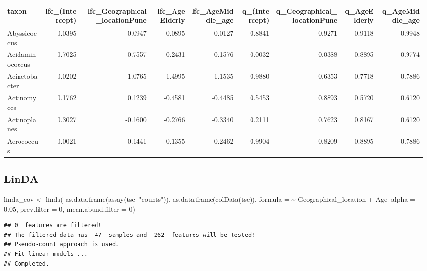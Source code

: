 \documentclass[
]{book}
\newenvironment{Shaded}{\begin{snugshade}}{\end{snugshade}}
\newcommand{\AttributeTok}[1]{\textcolor[rgb]{0.77,0.63,0.00}{#1}}
\newcommand{\DecValTok}[1]{\textcolor[rgb]{0.00,0.00,0.81}{#1}}
\newcommand{\FloatTok}[1]{\textcolor[rgb]{0.00,0.00,0.81}{#1}}
\newcommand{\FunctionTok}[1]{\textcolor[rgb]{0.00,0.00,0.00}{#1}}
\newcommand{\NormalTok}[1]{#1}
\newcommand{\OtherTok}[1]{\textcolor[rgb]{0.56,0.35,0.01}{#1}}
\newcommand{\StringTok}[1]{\textcolor[rgb]{0.31,0.60,0.02}{#1}}
\begin{document}
\begin{tabular}{l|r|r|r|r|r|r|r|r}
\hline
taxon & lfc\_(Intercept) & lfc\_Geographical\_locationPune & lfc\_AgeElderly & lfc\_AgeMiddle\_age & q\_(Intercept) & q\_Geographical\_locationPune & q\_AgeElderly & q\_AgeMiddle\_age\\
\hline
Abyssicoccus & 0.0395 & -0.0947 & 0.0895 & 0.0127 & 0.8841 & 0.9271 & 0.9118 & 0.9948\\
\hline
Acidaminococcus & 0.7025 & -0.7557 & -0.2431 & -0.1576 & 0.0032 & 0.0388 & 0.8895 & 0.9774\\
\hline
Acinetobacter & 0.0202 & -1.0765 & 1.4995 & 1.1535 & 0.9880 & 0.6353 & 0.7718 & 0.7886\\
\hline
Actinomyces & 0.1762 & 0.1239 & -0.4581 & -0.4485 & 0.5453 & 0.8893 & 0.5720 & 0.6120\\
\hline
Actinoplanes & 0.3027 & -0.1600 & -0.2766 & -0.3340 & 0.2111 & 0.7623 & 0.8167 & 0.6120\\
\hline
Aerococcus & 0.0021 & -0.1441 & 0.1355 & 0.2462 & 0.9904 & 0.8209 & 0.8895 & 0.7886\\
\hline
\end{tabular}

\hypertarget{linda-1}{%
\subsection{LinDA}\label{linda-1}}

\begin{Shaded}
\begin{Highlighting}[]
\NormalTok{linda\_cov }\OtherTok{\textless{}{-}} \FunctionTok{linda}\NormalTok{(}
  \FunctionTok{as.data.frame}\NormalTok{(}\FunctionTok{assay}\NormalTok{(tse, }\StringTok{"counts"}\NormalTok{)), }
  \FunctionTok{as.data.frame}\NormalTok{(}\FunctionTok{colData}\NormalTok{(tse)), }
  \AttributeTok{formula =} \StringTok{\textquotesingle{}\textasciitilde{} Geographical\_location + Age\textquotesingle{}}\NormalTok{, }
  \AttributeTok{alpha =} \FloatTok{0.05}\NormalTok{, }
  \AttributeTok{prev.filter =} \DecValTok{0}\NormalTok{, }
  \AttributeTok{mean.abund.filter =} \DecValTok{0}\NormalTok{)}
\end{Highlighting}
\end{Shaded}

\begin{verbatim}
## 0  features are filtered!
## The filtered data has  47  samples and  262  features will be tested!
## Pseudo-count approach is used.
## Fit linear models ...
## Completed.
\end{verbatim}
\end{document}
